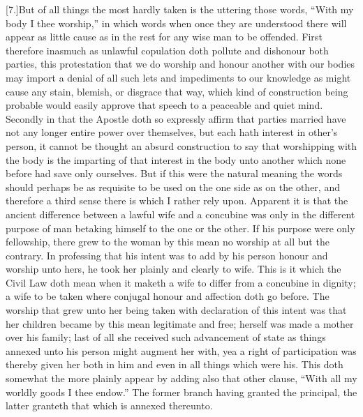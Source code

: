 [7.]But of all things the most hardly taken is the uttering those words, “With my body I thee worship,” in which  words when once they are understood there will appear as little cause as in the rest for any wise man to be offended. First therefore inasmuch as unlawful copulation doth pollute and dishonour both parties, this protestation that we do worship and honour another with our bodies may import a denial of all such lets and impediments to our knowledge as might cause any stain, blemish, or disgrace that way, which kind of construction being probable would easily approve that speech to a peaceable and quiet mind. Secondly in that the Apostle doth so expressly affirm that parties married have not any longer entire power over themselves, but each hath interest in other’s person, it cannot be thought an absurd construction to say that worshipping with the body is the imparting of that interest in the body unto another which none before had save only ourselves. But if this were the natural meaning the words should perhaps be as requisite to be used on the one side as on the other, and therefore a third sense there is which I rather rely upon. Apparent it is that the ancient difference between a lawful wife and a concubine was only in the different purpose of man betaking himself to the one or the other. If his purpose were only fellowship, there grew to the woman by this mean no worship at all but the contrary. In professing that his intent was to add by his person honour and worship unto hers, he took her plainly and clearly to wife. This is it which the Civil Law doth mean when it maketh a wife to differ from a concubine in dignity; a wife to be taken where conjugal honour and affection doth go before. The  worship that grew unto her being taken with declaration of this intent was that her children became by this mean legitimate and free;
 herself was made a mother over his family; last of all she received such advancement of state as things annexed unto his person might augment her with, yea a right of participation was thereby given her both in him and even in all things which were his. This doth somewhat the more plainly appear by adding also that other clause, “With all my worldly goods I thee endow.” The former branch having granted the principal, the latter granteth that which is annexed thereunto.

